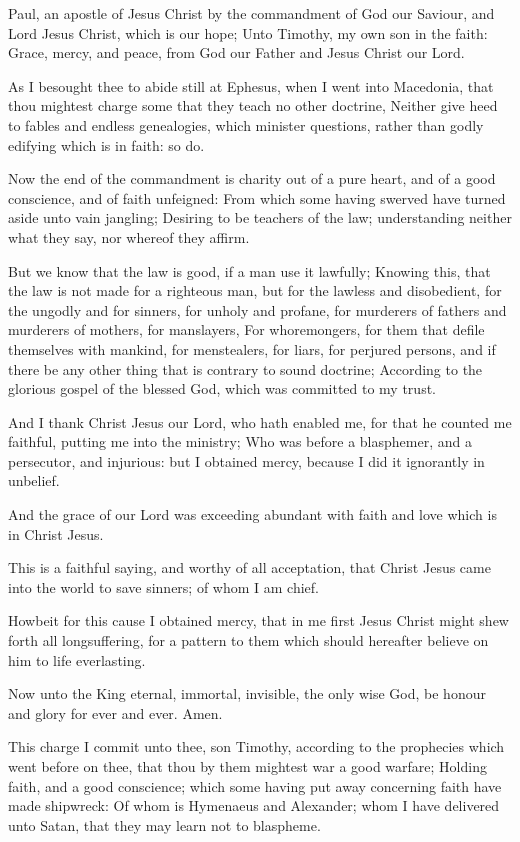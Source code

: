 \Chapter
\Verse Paul, an apostle of Jesus Christ by the commandment of God our Saviour, and Lord Jesus Christ, which is our hope; \Verse Unto Timothy, my own son in the faith: Grace, mercy, and peace, from God our Father and Jesus Christ our Lord.

\Verse As I besought thee to abide still at Ephesus, when I went into Macedonia, that thou mightest charge some that they teach no other doctrine, \Verse Neither give heed to fables and endless genealogies, which minister questions, rather than godly edifying which is in faith: so do.

\Verse Now the end of the commandment is charity out of a pure heart, and of a good conscience, and of faith unfeigned: \Verse From which some having swerved have turned aside unto vain jangling; \Verse Desiring to be teachers of the law; understanding neither what they say, nor whereof they affirm.

\Verse But we know that the law is good, if a man use it lawfully; \Verse Knowing this, that the law is not made for a righteous man, but for the lawless and disobedient, for the ungodly and for sinners, for unholy and profane, for murderers of fathers and murderers of mothers, for manslayers, \Verse For whoremongers, for them that defile themselves with mankind, for menstealers, for liars, for perjured persons, and if there be any other thing that is contrary to sound doctrine; \Verse According to the glorious gospel of the blessed God, which was committed to my trust.

\Verse And I thank Christ Jesus our Lord, who hath enabled me, for that he counted me faithful, putting me into the ministry; \Verse Who was before a blasphemer, and a persecutor, and injurious: but I obtained mercy, because I did it ignorantly in unbelief.

\Verse And the grace of our Lord was exceeding abundant with faith and love which is in Christ Jesus.

\Verse This is a faithful saying, and worthy of all acceptation, that Christ Jesus came into the world to save sinners; of whom I am chief.

\Verse Howbeit for this cause I obtained mercy, that in me first Jesus Christ might shew forth all longsuffering, for a pattern to them which should hereafter believe on him to life everlasting.

\Verse Now unto the King eternal, immortal, invisible, the only wise God, be honour and glory for ever and ever. Amen.

\Verse This charge I commit unto thee, son Timothy, according to the prophecies which went before on thee, that thou by them mightest war a good warfare; \Verse Holding faith, and a good conscience; which some having put away concerning faith have made shipwreck: \Verse Of whom is Hymenaeus and Alexander; whom I have delivered unto Satan, that they may learn not to blaspheme.


